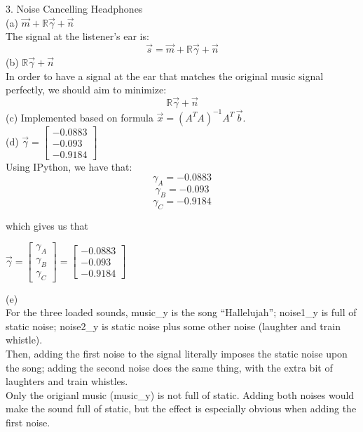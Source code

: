 \documentclass{article}
\begin{document}
{\Large 3. Noise Cancelling Headphones} \\[.5cm]
{\color{red} (a) $\vec{m} + \mathbb{R}\vec{\gamma} + \vec{n}$} \\

The signal at the listener's ear is:
$$\vec{s} = \vec{m} + \mathbb{R}\vec{\gamma} + \vec{n}$$
{\color{red} (b) $\mathbb{R}\vec{\gamma} + \vec{n}$} \\

In order to have a signal at the ear that matches the original music signal perfectly, we should aim to minimize:
$$\mathbb{R}\vec{\gamma} + \vec{n}$$
{\color{red} (c) Implemented based on formula
$\vec{x} = (A^TA)^{-1}A^T\,\vec{b}$.} \\[.5cm]
{\color{red} (d)
$\vec{\gamma} =
	\begin{bmatrix}
         -0.0883 \\
 		-0.093 \\
 		-0.9184
 	\end{bmatrix}$ } \\

Using IPython, we have that:
$$\gamma_A = -0.0883$$
$$\gamma_B = -0.093$$
$$\gamma_C = -0.9184$$

which gives us that
\begin{center}
$\vec{\gamma} =
    \begin{bmatrix}
        \gamma_A \\
		\gamma_B \\
		\gamma_C
	\end{bmatrix} =
	\begin{bmatrix}
        -0.0883 \\
		-0.093 \\
		-0.9184
	\end{bmatrix}$
\end{center}
{\color{red} (e)} \\

For the three loaded sounds, music\_y is the song ``Hallelujah''; noise1\_y is full of static noise; noise2\_y is static noise plus some other noise (laughter and train whistle). \\

Then, adding the first noise to the signal literally imposes the static noise upon the song; adding the second noise does the same thing, with the extra bit of laughters and train whistles. \\

Only the origianl music (music\_y) is not full of static. Adding both noises would make the sound full of static, but the effect is especially obvious when adding the first noise.
\end{document}

